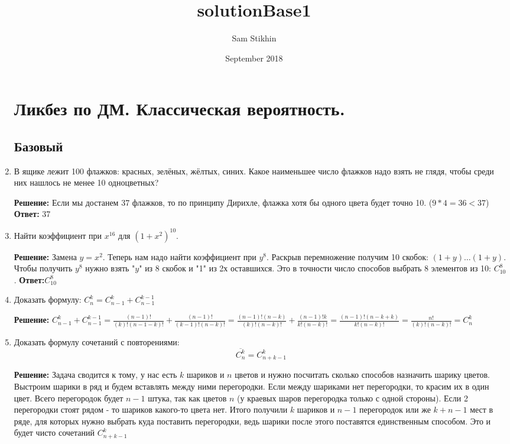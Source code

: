 \documentclass[a4paper, 14pt]{extarticle}
\title{solutionBase1}
\author{Sam Stikhin}
\date{September 2018}
\begin{document}
\begin{enumerate}
\section*{Ликбез по ДМ. Классическая вероятность.}
\subsection*{Базовый}
\item В ящике лежит 100 флажков: красных, зелёных,
жёлтых, синих. Какое наименьшее
число флажков надо взять не глядя, чтобы
среди них нашлось не менее 10 одноцветных?


\textbf{Решение:}
Если мы достанем 37 флажков, то по принципу Дирихле, флажка хотя бы одного цвета будет точно 10. ($9*4=36<37$) 
\newline
\textbf{Ответ:} 37

\item Найти коэффициент при $x^{16}$ для $(1 + x^2)^{10}$.


\textbf{Решение:}
Замена $y=x^2$. Теперь нам надо найти коэффициент при $y^8$. Раскрыв перемножение получим 10 скобок: $(1+y)\ldots(1+y)$. Чтобы получить $y^8$ нужно взять "$y$" из 8 скобок и "1" из 2х оставшихся. Это в точности число способов выбрать 8 элементов из 10: $C_{10}^8$.
\newline
\textbf{Ответ:}$C_{10}^8$


\item Доказать формулу: $C_{n}^k = C_{n-1}^k + C_{n-1}^{k-1}$

\textbf{Решение:}
$C_{n-1}^k + C_{n-1}^{k-1} = \frac{(n-1)!}{(k)!(n-1-k)!} + \frac{(n-1)!}{(k-1)!(n-k)!} = \frac{(n-1)!(n-k)}{(k)!(n-k)!} + \frac{(n-1)!k}{k!(n-k)!} = \frac{(n-1)!(n - k + k)}{k!(n-k)!} = \frac{n!}{(k)!(n-k)!} = C_n^k$


\item Доказать формулу сочетаний с повторениями: 
$$\overline{C_n^k} = C_{n+k-1}^k$$

\textbf{Решение:} Задача сводится к тому, у нас есть $k$ шариков и $n$ цветов и нужно посчитать сколько способов назначить шарику цветов. Выстроим шарики в ряд и будем вставлять между ними перегородки. Если между шариками нет перегородки, то красим их в один цвет. Всего перегородок будет $n-1$ штука, так как цветов $n$ (у краевых шаров перегородка только с одной стороны). Если 2 перегородки стоят рядом - то шариков какого-то цвета нет. Итого получили $k$ шариков и $n-1$ перегородок или же $k+n-1$ мест в ряде, для которых нужно выбрать куда поставить перегородки, ведь шарики после этого поставятся единственным способом. Это и будет чисто сочетаний $C_{n+k-1}^{k}$



\end{enumerate}
\end{document}

